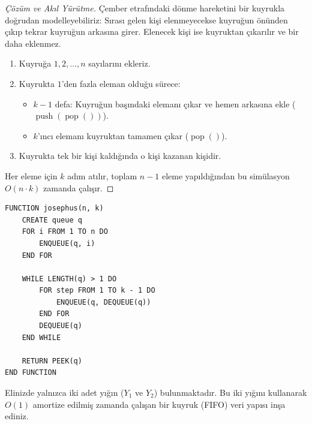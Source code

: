 \begin{proof}[Çözüm ve Akıl Yürütme]
Çember etrafındaki dönme hareketini bir kuyrukla doğrudan modelleyebiliriz: Sırası gelen kişi elenmeyecekse kuyruğun önünden çıkıp tekrar kuyruğun arkasına girer. Elenecek kişi ise kuyruktan çıkarılır ve bir daha eklenmez.

\begin{enumerate}
    \item Kuyruğa $1, 2, \dots, n$ sayılarını ekleriz.
    \item Kuyrukta $1$'den fazla eleman olduğu sürece:
    \begin{itemize}
        \item $k - 1$ defa: Kuyruğun başındaki elemanı çıkar ve hemen arkasına ekle ($\operatorname{push}(\operatorname{pop}())$).
        \item $k$'ıncı elemanı kuyruktan tamamen çıkar ($\operatorname{pop}()$).
    \end{itemize}
    \item Kuyrukta tek bir kişi kaldığında o kişi kazanan kişidir.
\end{enumerate}

Her eleme için $k$ adım atılır, toplam $n - 1$ eleme yapıldığından bu simülasyon $O(n \cdot k)$ zamanda çalışır.
\end{proof}

\begin{lstlisting}
FUNCTION josephus(n, k)
    CREATE queue q
    FOR i FROM 1 TO n DO
        ENQUEUE(q, i)
    END FOR

    WHILE LENGTH(q) > 1 DO
        FOR step FROM 1 TO k - 1 DO
            ENQUEUE(q, DEQUEUE(q))
        END FOR
        DEQUEUE(q)
    END WHILE

    RETURN PEEK(q)
END FUNCTION\end{lstlisting}

\begin{example}
Elinizde yalnızca iki adet yığın ($Y_1$ ve $Y_2$) bulunmaktadır. Bu iki yığını kullanarak $O(1)$ amortize edilmiş zamanda çalışan bir kuyruk (FIFO) veri yapısı inşa ediniz.
\end{example}

